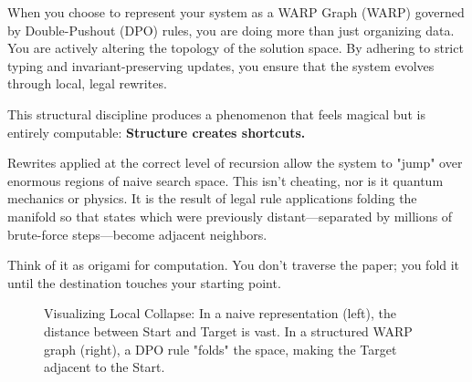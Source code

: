 When you choose to represent your system as a WARP Graph (WARP) governed by Double-Pushout (DPO) rules, you are doing more than just organizing data. You are actively altering the topology of the solution space. By adhering to strict typing and invariant-preserving updates, you ensure that the system evolves through local, legal rewrites.

This structural discipline produces a phenomenon that feels magical but is entirely computable: \textbf{Structure creates shortcuts.}

Rewrites applied at the correct level of recursion allow the system to "jump" over enormous regions of naive search space. This isn't cheating, nor is it quantum mechanics or physics. It is the result of legal rule applications folding the manifold so that states which were previously distant—separated by millions of brute-force steps—become adjacent neighbors.

Think of it as origami for computation. You don't traverse the paper; you fold it until the destination touches your starting point.

\begin{figure}[h]
\centering
{}
\caption{Visualizing Local Collapse: In a naive representation (left), the distance between Start and Target is vast. In a structured WARP graph (right), a DPO rule "folds" the space, making the Target adjacent to the Start.}
\end{figure}

